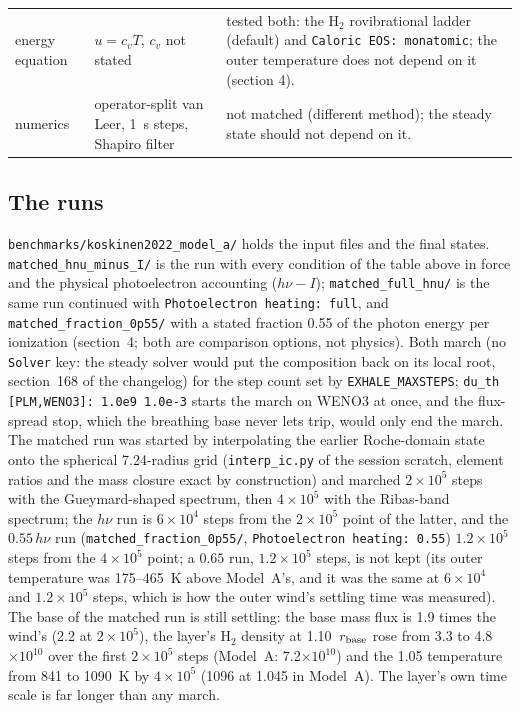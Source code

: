 \documentclass[english,a4paper]{my_memo}
\begin{document}
{\begin{longtable}{@{}p{3.1cm}p{4.5cm}p{6.6cm}@{}}
energy equation & $u = c_v T$, $c_v$ not stated & tested both: the H$_2$ rovibrational ladder (default) and \texttt{Caloric EOS: monatomic}; the outer temperature does not depend on it (section 4). \\
numerics & operator-split van Leer, 1~s steps, Shapiro filter & not matched (different method); the steady state should not depend on it. \\
\end{longtable}}

\subsection{The runs}
\label{sec:runs}

\texttt{benchmarks/koskinen2022\_model\_a/} holds the input files and the
final states. \texttt{matched\_hnu\_minus\_I/} is the run with every
condition of the table above in force and the physical photoelectron
accounting ($h\nu - I$); \texttt{matched\_full\_hnu/} is the same run
continued with \texttt{Photoelectron heating: full}, and
\texttt{matched\_fraction\_0p55/} with a stated fraction 0.55 of the photon
energy per ionization (section~4; both are comparison options, not
physics). Both march
(no \texttt{Solver} key: the steady solver would put the composition back on
its local root, section~168 of the changelog) for the step count set by
\texttt{EXHALE\_MAXSTEPS}; \texttt{du\_th [PLM,WENO3]: 1.0e9 1.0e-3} starts
the march on WENO3 at once, and the flux-spread stop, which the breathing
base never lets trip, would only end the march. The
matched run was started by interpolating the earlier Roche-domain state onto
the spherical 7.24-radius grid (\texttt{interp\_ic.py} of the session
scratch, element ratios and the mass closure exact by construction) and
marched $2\times10^5$ steps with the Gueymard-shaped spectrum, then
$4\times10^5$ with the Ribas-band spectrum; the $h\nu$ run is
$6\times10^4$ steps from the $2\times10^5$ point of the latter, and the
$0.55\,h\nu$ run (\texttt{matched\_fraction\_0p55/}, \texttt{Photoelectron
heating: 0.55}) $1.2\times10^5$ steps from the $4\times10^5$ point; a
$0.65$ run, $1.2\times10^5$ steps, is not kept (its outer temperature was
175--465~K above Model~A's, and it was the same at $6\times10^4$ and
$1.2\times10^5$ steps, which is how the outer wind's settling time was
measured). The base of
the matched run is still settling: the base mass flux is 1.9 times the
wind's (2.2 at $2\times10^5$), the layer's H$_2$ density at
1.10~$r_{\rm base}$ rose from 3.3 to 4.8$\times10^{10}$ over the first
$2\times10^5$ steps (Model~A: 7.2$\times10^{10}$) and the 1.05 temperature
from 841 to 1090~K by $4\times10^5$ (1096 at 1.045 in Model~A). The layer's
own time scale is far longer than any march.
\end{document}
